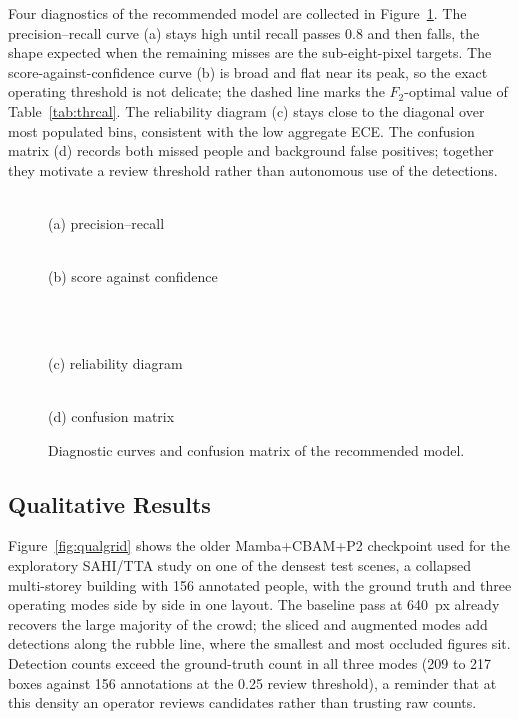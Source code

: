 Four diagnostics of the recommended model are collected in
Figure~\ref{fig:diag}. The precision--recall curve (a) stays high until
recall passes $0.8$ and then falls, the shape expected when the remaining
misses are the sub-eight-pixel targets. The score-against-confidence curve
(b) is broad and flat near its peak, so the exact operating threshold is not
delicate; the dashed line marks the $F_2$-optimal value of
Table~\ref{tab:thrcal}. The reliability diagram (c) stays close to the
diagonal over most populated bins, consistent with the low aggregate ECE.
The confusion matrix (d) records both missed people and background false
positives; together they motivate a review threshold rather than autonomous
use of the detections.

\begin{figure}[tbp]
  \centering
  \begin{minipage}[t]{0.49\linewidth}\centering
    \\[2pt]
    {\small (a) precision--recall}
  \end{minipage}\hfill
  \begin{minipage}[t]{0.49\linewidth}\centering
    \\[2pt]
    {\small (b) score against confidence}
  \end{minipage}\\[6pt]
  \begin{minipage}[t]{0.49\linewidth}\centering
    \\[2pt]
    {\small (c) reliability diagram}
  \end{minipage}\hfill
  \begin{minipage}[t]{0.49\linewidth}\centering
    \\[2pt]
    {\small (d) confusion matrix}
  \end{minipage}
  \caption{Diagnostic curves and confusion matrix of the recommended model.}
  \label{fig:diag}
\end{figure}

\subsection{Qualitative Results}
\label{sec:qual}
Figure~\ref{fig:qualgrid} shows the older Mamba+CBAM+P2 checkpoint used for the
exploratory SAHI/TTA study on one of the densest test scenes, a collapsed
multi-storey building with 156 annotated people, with the ground truth and
three operating modes side by side in one layout.
The baseline pass at 640~px already recovers the large majority of the crowd;
the sliced and augmented modes add detections along the rubble line, where
the smallest and most occluded figures sit. Detection counts exceed the
ground-truth count in all three modes (209 to 217 boxes against 156
annotations at the 0.25 review threshold), a reminder that at this density an
operator reviews candidates rather than trusting raw counts.

